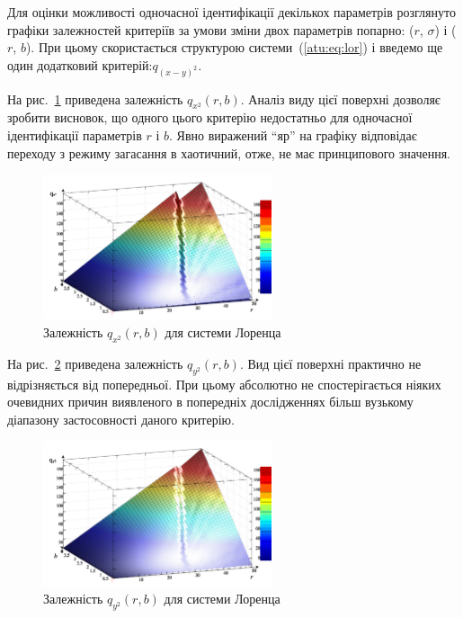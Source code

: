 Для оцінки можливості одночасної ідентифікації декількох параметрів
розглянуто графіки залежностей критеріїв за умови зміни двох параметрів
попарно: ($r$, $\sigma$) і ($r$, $b$).
%
При цьому скористається структурою системи~(\ref{atu:eq:lor}) і введемо
ще один додатковий критерій:$ q_{(x-y)^2} $.

На рис.~\ref{atu:f:lor_qx2_r_b} приведена залежність
$ q_{x^2} (r, b) $. Аналіз виду цієї поверхні дозволяє зробити
висновок, що одного цього критерію недостатньо для одночасної
ідентифікації параметрів
$ r $ і
$ b $. Явно виражений ``яр'' на графіку відповідає переходу з режиму
загасання в хаотичний, отже, не має принципового значення.

\begin{figure}[ht!]
  \centerline{  \includegraphics[width=0.60\textwidth]{p/cha/lor/q2d/lor_qx2_r_b.png}  }
  \caption{Залежність $ q_{x^2} (r, b) $ для системи Лоренца}
  \label{atu:f:lor_qx2_r_b}
\end{figure}


На рис.~\ref{atu:f:lor_qy2_r_b} приведена залежність
$ q_{y^2} (r, b) $. Вид цієї поверхні практично не відрізняється від
попередньої. При цьому абсолютно не спостерігається ніяких
очевидних причин виявленого в попередніх дослідженнях більш
вузькому діапазону застосовності даного критерію.

\begin{figure}[ht!]
  \centerline{  \includegraphics[width=0.60\textwidth]{p/cha/lor/q2d/lor_qy2_r_b.png}  }
  \caption{Залежність $ q_{y^2} (r, b) $ для системи Лоренца}
  \label{atu:f:lor_qy2_r_b}
\end{figure}

